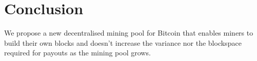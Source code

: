 \documentclass{article}
\begin{document}



\section{Conclusion}

We propose a new decentralised mining pool for Bitcoin that enables
miners to build their own blocks and doesn't increase the variance nor
the blockspace required for payouts as the mining pool grows.



 

\end{document}

